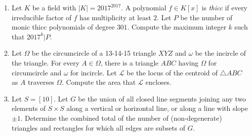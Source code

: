 \documentclass[12pt]{article}
\begin{document}
\begin{multicols}{2}
\begin{enumerate}
\item Let $K$ be a field with $|K| = 2017^{2017}$. A polynomial $f \in K[x]$ is \textit{thicc} if every irreducible factor of $f$ has multiplicity at least $2$. Let $P$ be the number of monic thicc polynomials of degree $301$. Compute the maximum integer $k$ such that $2017^{k} | P$.  

\item Let $\Omega$ be the circumcircle of a 13-14-15 triangle $XYZ$ and $\omega$ be the incircle of the triangle. For every $A \in \Omega$, there is a triangle $ABC$ having $\Omega$ for circumcircle and $\omega$ for incircle. Let $\mathcal{L}$ be the locus of the centroid of $\triangle ABC$ as $A$ traverses $\Omega$. Compute the area that $\mathcal{L}$ encloses. 

\item Let $S = [10]$. Let $G$ be the union of all closed line segments joining any two elements of $S \times S$ along a vertical or horizontal line, or along a line with slope $\pm 1$. Determine the combined total of the number of (non-degenerate) triangles and rectangles for which all edges are subsets of $G$. 

\end{enumerate}
\end{multicols}
\end{document}
